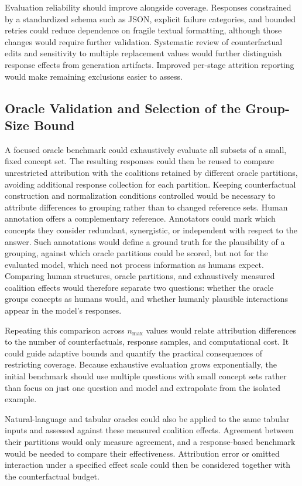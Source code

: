 Evaluation reliability should improve alongside coverage. Responses constrained by a standardized schema such as JSON, explicit failure categories, and bounded retries could reduce dependence on fragile textual formatting, although those changes would require further validation. Systematic review of counterfactual edits and sensitivity to multiple replacement values would further distinguish response effects from generation artifacts. Improved per-stage attrition reporting would make remaining exclusions easier to assess.

\subsection{Oracle Validation and Selection of the Group-Size Bound}

A focused oracle benchmark could exhaustively evaluate all subsets of a small, fixed concept set. The resulting responses could then be reused to compare unrestricted attribution with the coalitions retained by different oracle partitions, avoiding additional response collection for each partition. Keeping counterfactual construction and normalization conditions controlled would be necessary to attribute differences to grouping rather than to changed reference sets. Human annotation offers a complementary reference. Annotators could mark which concepts they consider redundant, synergistic, or independent with respect to the answer. Such annotations would define a ground truth for the plausibility of a grouping, against which oracle partitions could be scored, but not for the evaluated model, which need not process information as humans expect. Comparing human structures, oracle partitions, and exhaustively measured coalition effects would therefore separate two questions: whether the oracle groups concepts as humans would, and whether humanly plausible interactions appear in the model's responses.

Repeating this comparison across $n_{\max}$ values would relate attribution differences to the number of counterfactuals, response samples, and computational cost. It could guide adaptive bounds and quantify the practical consequences of restricting coverage. Because exhaustive evaluation grows exponentially, the initial benchmark should use multiple questions with small concept sets rather than focus on just one question and model and extrapolate from the isolated example.

Natural-language and tabular oracles could also be applied to the same tabular inputs and assessed against these measured coalition effects. Agreement between their partitions would only measure agreement, and a response-based benchmark would be needed to compare their effectiveness. Attribution error or omitted interaction under a specified effect scale could then be considered together with the counterfactual budget.

